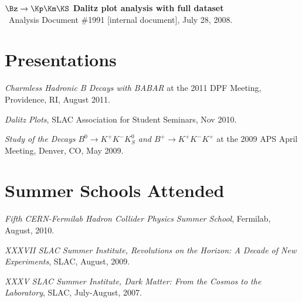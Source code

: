 \documentclass[12pt,letterpaper]{MACPcv}
\newcommand{\bkkks}{\ensuremath{\Bz \rightarrow \Kp\Km\KS}\xspace}
\begin{document}
\begin{cv}
\begin{publications}
\begin{Simplelist}
\item
{\bf {\boldmath \bkkks} Dalitz plot analysis with full dataset}
\\ {}\babar\ Analysis Document \#1991 [internal document], July 28, 2008.


  \end{Simplelist}

\end{publications}



\section{Presentations}

\begin{Simplelist}

\item {\it Charmless Hadronic B Decays with BABAR} at the 2011 DPF Meeting, 
Providence, RI, August 2011.

\item  {\it Dalitz Plots},  SLAC Association for Student Seminars, Nov 2010.

\item {\it Study of the Decays $B^0 \to K^+K^-K^0_S$ and $B^+ \to K^+K^-K^+$} at the 2009 APS April Meeting, 
Denver, CO, May 2009.


\end{Simplelist}




\section{Summer Schools Attended}

\begin{Simplelist}

\item {\it Fifth CERN-Fermilab Hadron Collider Physics Summer School}, Fermilab, August, 2010.

\item {\it XXXVII SLAC Summer Institute, Revolutions on the Horizon: A Decade of New Experiments}, SLAC, 
August, 2009.

\item {\it XXXV SLAC Summer Institute, Dark Matter: From the Cosmos to the Laboratory}, SLAC, July-August, 2007.

\end{Simplelist}






\end{cv}
\end{document}
